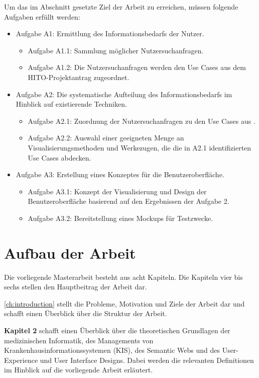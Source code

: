 Um das im Abschnitt  gesetzte Ziel der Arbeit zu erreichen, müssen folgende Aufgaben erfüllt werden:

\begin{itemize}
	\item Aufgabe A1: Ermittlung des Informationsbedarfs der Nutzer.
		\begin{itemize}
		\item Aufgabe A1.1: Sammlung möglicher Nutzersuchanfragen.
		\item Aufgabe A1.2: Die Nutzersuchanfragen werden den Use Cases aus dem HITO-Projektantrag zugeordnet.
		\end{itemize}
	\item Aufgabe A2: Die systematische Aufteilung des Informationsbedarfs im Hinblick auf existierende Techniken.
		\begin{itemize}
		\item Aufgabe A2.1: Zuordnung der Nutzersuchanfragen zu den Use Cases aus \citet{linkeddatavisualization}.
		\item Aufgabe A2.2: Auswahl einer geeigneten Menge an Visualisierungsmethoden und Werkezugen, die die in A2.1 identifizierten Use Cases abdecken.
		\end{itemize}
	\item Aufgabe A3: Erstellung eines Konzeptes für die Benutzeroberfläche.
		\begin{itemize}
		\item Aufgabe A3.1: Konzept der Visualisierung und Design der Benutzeroberfläche basierend auf den Ergebnissen der Aufgabe 2.
		\item Aufgabe A3.2: Bereitstellung eines Mockups für Testzwecke.
		\end{itemize}
\end{itemize}

\section{Aufbau der Arbeit}\label{sec:aufbau}

Die vorliegende Masterarbeit besteht aus acht Kapiteln. Die Kapiteln vier bis sechs stellen den Hauptbeitrag der Arbeit dar. \newline

\cref{ch:introduction} stellt die Probleme, Motivation und Ziele der Arbeit dar und schafft einen Überblick über die Struktur der Arbeit. \newline

\textbf{Kapitel 2} schafft einen Überblick über die theoretischen Grundlagen der medizinischen Informatik, des Managements von Krankenhausinformationssystemen (KIS), des Semantic Webs und des User-Experience und User Interface Designs. Dabei werden die relevanten Definitionen im Hinblick auf die vorliegende Arbeit erläutert.  \newline

